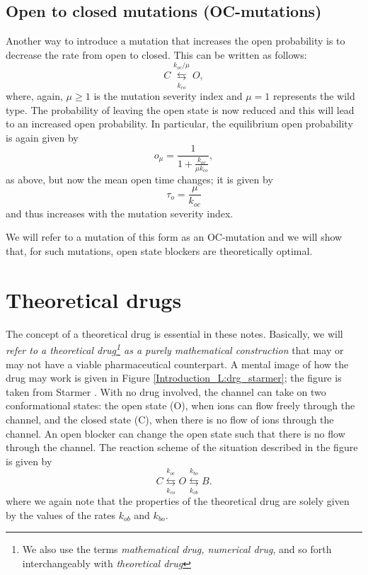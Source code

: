 \subsection{Open to closed mutations (OC-mutations)}
Another way to introduce a mutation that increases the open probability is to decrease the rate from open to closed. This can be written as follows:
\begin{equation}
C\underset{ k_{co}}{\overset{k_{oc}/\mu}{\leftrightarrows}}O,
\end{equation}
where, again, $\mu \ge 1$ is the mutation severity index and $\mu=1$ represents the wild type. The probability of leaving the open state is now reduced and this will lead to an increased open probability.
In particular, the equilibrium open probability is again given by
\[ o_\mu=\frac{1}{1+\frac{k_{oc}}{\mu k_{co}}}, \]
as above, but now the mean open time changes; it is given by
\[ \tau_o=\frac{\mu}{k_{oc}}\]
and thus increases with the mutation severity index.

We will refer to a mutation of this form as an OC-mutation and we will show that, for such mutations, open state blockers are theoretically optimal.

\section{Theoretical drugs}
\label{theoreticaldrugs}

The concept of a theoretical drug is essential in these notes. Basically, we will {\em  refer to a theoretical drug\footnote{We also use the terms \textit{mathematical drug, numerical drug}, and so forth interchangeably with \textit{theoretical drug}} as a purely mathematical construction} that may or may not have a viable pharmaceutical counterpart. A mental image of how the drug may work is given in Figure \ref{Introduction_L:drg_starmer}; the figure is taken from Starmer \cite{Starmer2002}. With no drug involved, the channel can take on two conformational states: the open state (O), when ions can flow freely through the channel, and the closed state (C), when there is no flow of ions through the channel. An open blocker can change the open state such that there is no flow through the channel. The reaction scheme of the situation described in the figure is given by
\begin{equation}
C\underset{ k_{co}}{\overset{k_{oc}}{\leftrightarrows}}O\underset{k_{ob}
}{\overset{k_{bo}}{\leftrightarrows}}B. \label{closed_block201}
\end{equation} where we again note that the properties of the theoretical drug are solely given by the values of the rates $k_{ob}$ and $k_{bo}$.

